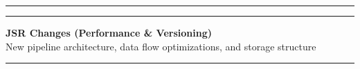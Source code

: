 \documentclass[10pt, a4paper]{article}
\begin{document}
\vspace{0.1em}

\begin{center}
    \noindent\rule{\linewidth}{1.5pt}
\end{center}

\vspace{0.1em}


\begin{center}
    \noindent\rule{\linewidth}{1.5pt}
    
    \vspace{0.02em}
    
    {\large \textbf{JSR Changes (Performance \& Versioning)}} \\[0.02em]
    {\footnotesize New pipeline architecture, data flow optimizations, and storage structure}
    
    \vspace{0.02em}
    
    \noindent\rule{\linewidth}{1.5pt}
\end{center}

\vspace{0.1em}
\end{document}
